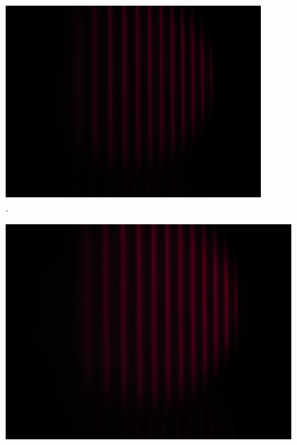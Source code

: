\begin{figure}[h!]
  \centering
  \includegraphics[width=0.85\textwidth]{data/temp/rot_ohneB_90.JPG}
  \caption{\cite{insert Beschriftung 5}.}
  \label{fig:roteOhneB90}
\end{figure}
\begin{figure}[h!]
  \centering
  \includegraphics[width=0.95\textwidth]{data/temp/rot_mitB_90.JPG}
  \caption{\cite{insert Beschriftung 6}}
  \label{fig:rotMitB90}
\end{figure}

